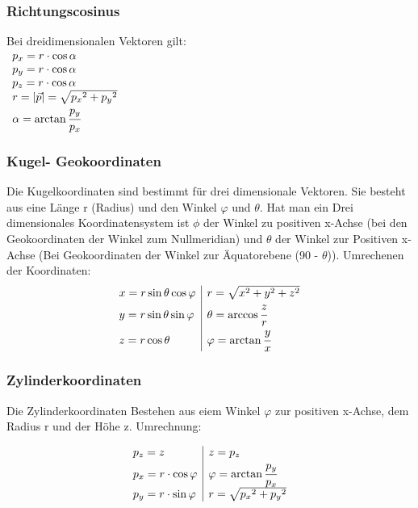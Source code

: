 \documentclass[a4paper,10pt]{scrartcl}
\begin{document}
            \subsubsection{Richtungscosinus}
                Bei dreidimensionalen Vektoren gilt: \\
                $\begin{array}{l}
                    p_x = r \cdot \cos \alpha \\
                    p_y = r \cdot \cos \alpha \\
                    p_z = r \cdot \cos \alpha \\
                    r = |\vec p| = \sqrt{{p_x}^2 + {p_y}^2} \\
                    \alpha = \arctan \cfrac{p_y}{p_x}
                \end{array}$
            \subsubsection{Kugel- Geokoordinaten}
            Die Kugelkoordinaten sind bestimmt für drei dimensionale Vektoren. Sie besteht aus eine Länge r (Radius) und den Winkel $\varphi$ und $\theta$. Hat man ein Drei dimensionales
            Koordinatensystem ist $\phi$ der Winkel zu positiven x-Achse (bei den Geokoordinaten der Winkel zum Nullmeridian) und $\theta$ der Winkel zur Positiven x-Achse 
            (Bei Geokoordinaten der Winkel zur Äquatorebene (90 - $\theta$)). Umrechenen der Koordinaten:
            \[
                \begin{array}{l|l}
                    x = r \sin \theta \cos \varphi & r = \sqrt{x^2 + y^2 + z^2} \\
                    y = r \sin \theta \sin \varphi & \theta = \arccos \cfrac{z}{r} \\
                    z = r \cos \theta & \varphi = \arctan \cfrac{y}{x}
                \end{array}
            \]
            \subsubsection{Zylinderkoordinaten}
            Die Zylinderkoordinaten Bestehen aus eiem Winkel $\varphi$ zur positiven x-Achse, dem Radius r und der Höhe z. Umrechnung:

            \[
                \begin{array}{l|l}
                    p_z = z & z = p_z \\
                    p_x = r \cdot \cos \varphi &  \varphi = \arctan \cfrac{p_y}{p_x} \\
                    p_y = r \cdot \sin \varphi & r = \sqrt{{p_x}^2 + {p_y}^2}  
                \end{array}
            \]
            \newpage
\end{document}
